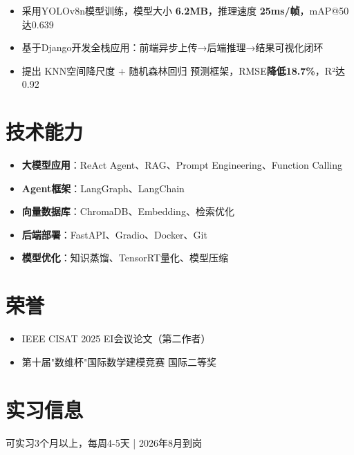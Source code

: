 \documentclass{resume}
\begin{document}
\begin{itemize}
  \item 采用YOLOv8n模型训练，模型大小 \textbf{6.2MB}，推理速度 \textbf{25ms/帧}，mAP@50达0.639
  \item 基于Django开发全栈应用：前端异步上传→后端推理→结果可视化闭环
\end{itemize}

\begin{itemize}
  \item 提出 KNN空间降尺度 + 随机森林回归 预测框架，RMSE\textbf{降低18.7\%}，R²达0.92
\end{itemize}

\section{技术能力}
\begin{itemize}
  \item \textbf{大模型应用}：ReAct Agent、RAG、Prompt Engineering、Function Calling
  \item \textbf{Agent框架}：LangGraph、LangChain
  \item \textbf{向量数据库}：ChromaDB、Embedding、检索优化
  \item \textbf{后端部署}：FastAPI、Gradio、Docker、Git
  \item \textbf{模型优化}：知识蒸馏、TensorRT量化、模型压缩
\end{itemize}

\section{荣誉}
\begin{itemize}
  \item IEEE CISAT 2025 EI会议论文（第二作者）
  \item 第十届"数维杯"国际数学建模竞赛 国际二等奖
\end{itemize}

\section{实习信息}
可实习3个月以上，每周4-5天 | 2026年8月到岗
\end{document}
